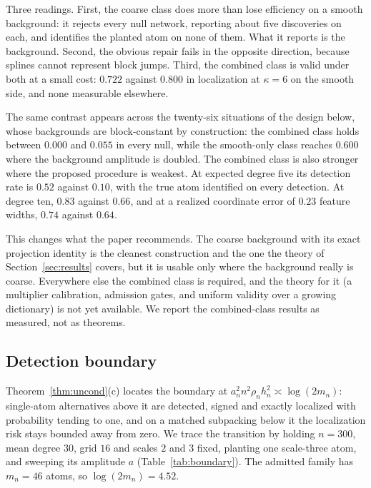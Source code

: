 \documentclass[11pt]{article}
\theoremstyle{definition}
\newcommand{\1}{\mathbf 1}\newcommand{\op}{\operatorname}
\begin{document}
Three readings.  First, the coarse class does more than lose efficiency on a smooth
background: it rejects every null network, reporting about five discoveries on
each, and identifies the planted atom on none of them.  What it reports is the
background.  Second, the obvious repair fails in the opposite direction, because
splines cannot represent block jumps.  Third, the combined class is valid under both at a
small cost: $0.722$ against $0.800$ in localization at $\kappa=6$ on the smooth
side, and none measurable elsewhere.

The same contrast appears across the twenty-six situations of the design below,
whose backgrounds are block-constant by construction: the combined class holds
between $0.000$ and $0.055$ in every null, while the smooth-only class reaches
$0.600$ where the background amplitude is doubled.  The combined class is also
stronger where the proposed procedure is weakest.  At expected degree five its
detection rate is $0.52$ against $0.10$, with the true atom identified on every
detection.  At degree ten, $0.83$ against $0.66$, and at a realized coordinate
error of $0.23$ feature widths, $0.74$ against $0.64$.

This changes what the paper recommends.  The coarse background with its exact
projection identity is the cleanest construction and the one the theory of
Section~\ref{sec:results} covers, but it is usable only where the background
really is coarse.  Everywhere else the combined class is required, and the theory
for it (a multiplier calibration, admission gates, and uniform validity over a
growing dictionary) is not yet available.  We report the combined-class results as
measured, not as theorems.

\subsection{Detection boundary}                             \label{sec:boundary}

Theorem~\ref{thm:uncond}(c) locates the boundary at
$a_n^2n^2\rho_nh_n^2\asymp\log(2m_n)$: single-atom alternatives above it are
detected, signed and exactly localized with probability tending to one, and on
a matched subpacking below it the localization risk stays bounded away from
zero.  We trace the transition by holding $n=300$, mean degree $30$, grid $16$
and scales $2$ and $3$ fixed, planting one scale-three atom, and sweeping its
amplitude $a$ (Table~\ref{tab:boundary}).  The admitted family has $m_n=46$
atoms, so $\log(2m_n)=4.52$.
\end{document}
